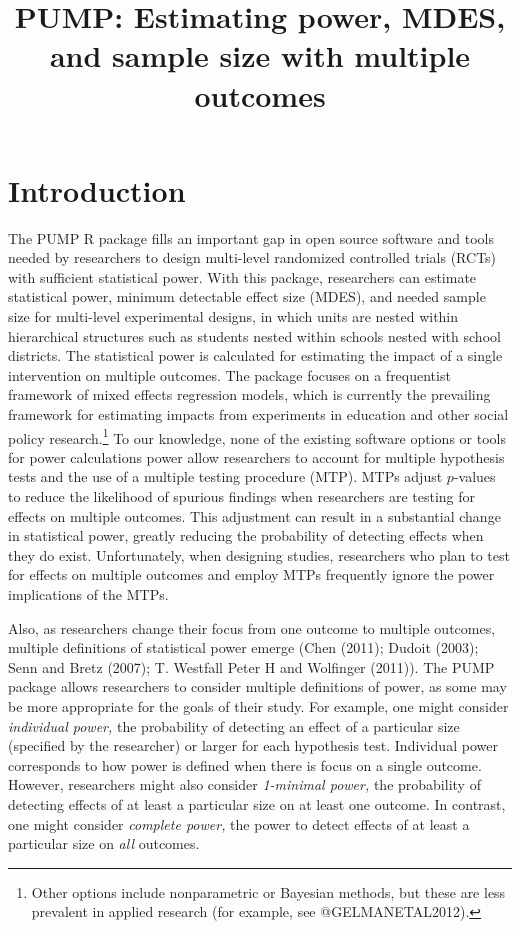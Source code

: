 \documentclass[
]{article}
\title{PUMP: Estimating power, MDES, and sample size with multiple
outcomes}
\author{}
\date{\vspace{-2.5em}}
\begin{document}
\maketitle

\section{Introduction}
\label{sec:intro}

The PUMP R package fills an important gap in open source software and
tools needed by researchers to design multi-level randomized controlled
trials (RCTs) with sufficient statistical power. With this package,
researchers can estimate statistical power, minimum detectable effect
size (MDES), and needed sample size for multi-level experimental
designs, in which units are nested within hierarchical structures such
as students nested within schools nested with school districts. The
statistical power is calculated for estimating the impact of a single
intervention on multiple outcomes. The package focuses on a frequentist
framework of mixed effects regression models, which is currently the
prevailing framework for estimating impacts from experiments in
education and other social policy
research.\footnote{Other options include nonparametric or Bayesian methods, but these are less prevalent in applied research (for example, see @GELMANETAL2012).}
To our knowledge, none of the existing software options or tools for
power calculations power allow researchers to account for multiple
hypothesis tests and the use of a multiple testing procedure (MTP). MTPs
adjust \(p\)-values to reduce the likelihood of spurious findings when
researchers are testing for effects on multiple outcomes. This
adjustment can result in a substantial change in statistical power,
greatly reducing the probability of detecting effects when they do
exist. Unfortunately, when designing studies, researchers who plan to
test for effects on multiple outcomes and employ MTPs frequently ignore
the power implications of the MTPs.

Also, as researchers change their focus from one outcome to multiple
outcomes, multiple definitions of statistical power emerge (Chen (2011);
Dudoit (2003); Senn and Bretz (2007); T. Westfall Peter H and Wolfinger
(2011)). The PUMP package allows researchers to consider multiple
definitions of power, as some may be more appropriate for the goals of
their study. For example, one might consider \emph{individual power,}
the probability of detecting an effect of a particular size (specified
by the researcher) or larger for each hypothesis test. Individual power
corresponds to how power is defined when there is focus on a single
outcome. However, researchers might also consider \emph{1-minimal
power,} the probability of detecting effects of at least a particular
size on at least one outcome. In contrast, one might consider
\emph{complete power,} the power to detect effects of at least a
particular size on \emph{all} outcomes.
\end{document}
